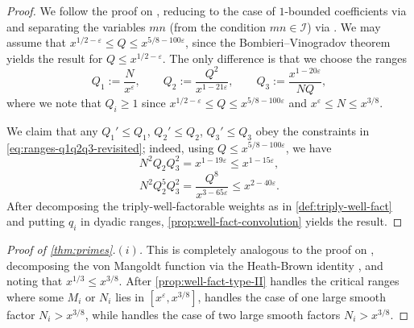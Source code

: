 \documentclass[reqno,11pt]{amsart}
\theoremstyle{remark}
\newtheorem*{remark}{Remark}
\numberwithin{equation}{section}
\newcommand{\mI}{\mathcal{I}}
\newcommand{\GL}{\textnormal{GL}}
\newcommand{\eps}{\varepsilon}
\begin{document}
\begin{proof}
We follow the proof on \cite[p.\,28]{maynard2025primes2}, reducing to the case of $1$-bounded coefficients via \cite[Lemma 5.1]{maynard2025primes2} and separating the variables $mn$ (from the condition $mn \in \mI$) via \cite[Lemma 5.2]{maynard2025primes2}. We may assume that $x^{1/2-\eps} \le Q \le x^{5/8-100\eps}$, since the Bombieri--Vinogradov theorem yields the result for $Q \le x^{1/2-\eps}$. The only difference is that we choose the ranges
\[
    Q_1 := \frac{N}{x^{\eps}},
    \qquad 
    Q_2 := \frac{Q^2}{x^{1-21\eps}},
    \qquad 
    Q_3 := \frac{x^{1-20\eps}}{NQ},
\] 
where we note that $Q_i \ge 1$ since $x^{1/2-\eps} \le Q \le x^{5/8-100\eps}$ and $x^\eps \le N \le x^{3/8}$.

We claim that any $Q_1' \le Q_1$, $Q_2' \le Q_2$, $Q_3' \le Q_3$ obey the constraints in \cref{eq:ranges-q1q2q3-revisited}; indeed, using $Q \le x^{5/8-100\eps}$, we have
\[
    N^2 Q_2 Q_3^2 = x^{1-19\eps} \le x^{1-15\eps},
\]    
\[
    N^2 Q_2^5 Q_3^{2}
    =
    \frac{Q^8}{x^{3-65\eps}}
    \le 
    x^{2-40\eps}.
\]
After decomposing the triply-well-factorable weights as in \cref{def:triply-well-fact} and putting $q_i$ in dyadic ranges, \cref{prop:well-fact-convolution} yields the result.
\end{proof}


\begin{proof}[Proof of \cref{thm:primes}.$(i)$]
This is completely analogous to the proof on \cite[p.\,10]{maynard2025primes2}, decomposing the von Mangoldt function via the Heath-Brown identity \cite[Lemma 4.3]{maynard2025primes2}, and noting that $x^{1/3} \le x^{3/8}$. After \cref{prop:well-fact-type-II} handles the critical ranges where some $M_i$ or $N_i$ lies in $[x^\eps, x^{3/8}]$, \cite[Lemma 4.4]{maynard2025primes2} handles the case of one large smooth factor $N_i > x^{3/8}$, while \cite[Proposition 4.2]{maynard2025primes2} handles the case of two large smooth factors $N_i > x^{3/8}$. 
\end{proof}

\end{document}
